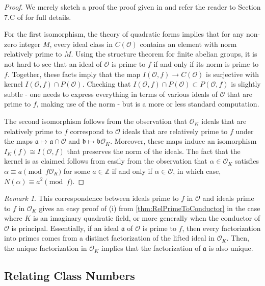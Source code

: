 \documentclass{amsart}
\theoremstyle{definition}
\theoremstyle{remark}
\newtheorem{remark}[thm]{Remark}
\numberwithin{equation}{section}
\newcommand{\cO}{\mathcal O}
\newcommand{\fka}{\mathfrak a}
\newcommand{\fkb}{\mathfrak b}
\newcommand{\bbZ}{\mathbb Z}
\newcommand{\inv}{^{-1}}
\begin{document}
\begin{proof}
We merely sketch a proof the proof given in \cite{CoxPrimes} and refer the reader to Section 7.C of \cite{CoxPrimes} for full details. 

For the first isomorphism, the theory of quadratic forms implies that for any non-zero integer $M$, every ideal class in $C(\cO)$ contains an element with norm relatively prime to $M$. Using the structure theorem for finite abelian groups, it is not hard to see that an ideal of $\cO$ is prime to $f$ if and only if its norm is prime to $f$. Together, these facts imply that the map $I(\cO, f) \to C(\cO)$ is surjective with kernel $I(\cO, f) \cap P(\cO)$. Checking that $I(\cO, f) \cap P(\cO) \subset P(\cO, f)$ is slightly subtle - one needs to express everything in terms of various ideals of $\cO$ that are prime to $f$, making use of the norm - 
but is a more or less standard computation.

The second isomorphism follows from the observation that $\cO_{K}$ ideals that are relatively prime to $f$ correspond to $\cO$ ideals that are relatively prime to $f$ under the maps $\fka \mapsto \fka \cap \cO$ and $\fkb \mapsto \fkb \cO_{K}$. Moreover, these maps induce an isomorphism $I_{K}(f) \cong I(\cO,f)$ that preserves the norm of the ideals. The fact that the kernel is as claimed follows from easily from the observation that $\alpha \in\cO_{K}$ satisfies $ \alpha \equiv a \pmod{f\cO_{K}}$ for some $a \in \bbZ$ if and only if $\alpha \in\cO$, in which case, $N(\alpha) \equiv a^2 \pmod{f}$. 
\end{proof}

\begin{remark}
This correspondence between ideals prime to $f$ in $\cO$ and ideals prime to $f$ in $\cO_{K}$ gives an easy proof of (i) from \ref{thm:RelPrimeToConductor} in the case where $K$ is an imaginary quadratic field, or more generally when the conductor of $\cO$ is principal. Essentially, if an ideal $\fka$ of $\cO$ is prime to $f$, then every factorization into primes comes from a distinct factorization of the lifted ideal in $\cO_{K}$. Then, the unique factorization in $\cO_{K}$ implies that the factorization of $\fka$ is also unique.
\end{remark}



\subsection{Relating Class Numbers}
\end{document}
